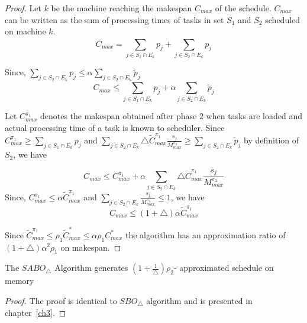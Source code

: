 \documentclass[twocolumn]{svjour3}
\begin{document}
\begin{proof}
  Let $k$ be the machine reaching the makespan $C_{max}$ of the
  schedule. $C_{max}$ can be written as the sum of processing times of
  tasks in set $S_1$ and $S_2$ scheduled on machine $k$.
  \begin{equation}\nonumber
    C_{max}= \sum_{j \in S_1 \cap E_k}^{}p_j+\sum_{j \in S_2 \cap E_k}^{}p_j 
  \end{equation}
  
  Since, $\sum\limits
  _{j \in S_2 \cap E_k}^{}p_j\leq\alpha\sum\limits
  _{j \in S_2 \cap E_k} \tilde{p}_j$
  \begin{equation}\nonumber
    C_{max} \leq \sum_{j \in S_1 \cap E_k}^{}p_j+\alpha\sum_{j \in S_2 \cap E_k} \tilde{p}_j 
  \end{equation}
  
  
  Let $C^{\pi_1}_{max}$ denotes the makespan obtained after phase 2
  when tasks are loaded and actual processing time of a task is known
  to scheduler. Since $C^{\pi_1}_{max} \geq \sum\limits _{j \in S_1
    \cap E_k}^{}p_j$ and $\sum\limits _{j \in S_2\cap E_k}\triangle
  {\tilde{C}^{\pi_1}_{max}} \frac{s_j}{M^{\pi_2}_{max}}\geq
  \sum\limits _{j \in S_2\cap E_k}^{}\tilde{p}_j $ by definition of
  $S_2$, we have
          
  \begin{equation}\nonumber
    C_{max}\leq C^{\pi_1}_{max}+\alpha\sum_{j \in S_2\cap E_k}^{}\triangle {\tilde{C}^{\pi_1}_{max}} \frac{s_j}{M^{\pi_2}_{max}}
  \end{equation}                    
  Since, $C^{\pi_1}_{max}\leq\alpha\tilde{C}^{\pi_1}_{max}$ and
  $\sum\limits_{j \in S_2\cap E_k} \frac{s_j}{M^{\pi_2}_{max}}\leq 1$,
  we have
  \begin{equation}
    \nonumber C_{max}\leq(1+\triangle)\alpha\tilde{C}^{\pi_1}_{max}
  \end{equation}
  
  Since $ \tilde{C}^{\pi_1}_{max} \leq \rho_1 \tilde{C}^{*}_{max}\leq
  \alpha\rho_1 {C}^{*}_{max}$ the algorithm has an approximation ratio
  of $(1+\triangle)\alpha^2 \rho_1$ on makespan.
\end{proof}
\begin{theorem} \label{th:chapter5-2b} The $SABO_\triangle$ Algorithm
  generates $ (1+\frac{1}{\triangle})\rho_2 $- approximated schedule
  on memory
\end{theorem}                      

\begin{proof}  
  The proof is identical to $SBO_\triangle$ algorithm and is presented
  in chapter~\ref{ch3}.
\end{proof}    
    
\end{document}
